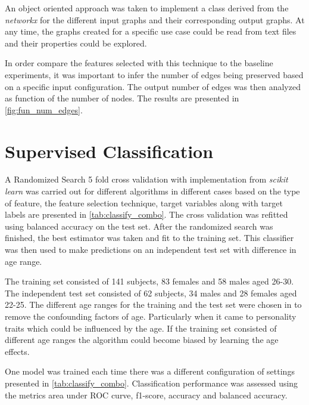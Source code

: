 \documentclass[msthesis.tex]{subfiles}
\begin{document}
An object oriented approach was taken to implement a class derived from the \textit{networkx} \citep{hagberg2008exploring} for the different input graphs and their corresponding output graphs. At any time, the graphs created for a specific use case could be read from text files and their properties could be explored.

In order compare the features selected with this technique to the baseline experiments, it was important to infer the number of edges being preserved based on a specific input configuration. The output number of edges was then analyzed as function of the number of nodes. The results are presented in \autoref{fig:fun_num_edges}.


\section{Supervised Classification}

A Randomized Search 5 fold cross validation with implementation from \textit{scikit learn} was carried out for different algorithms in different cases based on the type of feature, the feature selection technique, target variables along with target labels are presented in \autoref{tab:classify_combo}. The cross validation was refitted using balanced accuracy on the test set. After the randomized search was finished, the best estimator was taken and fit to the training set. This classifier was then used to make predictions on an independent test set with difference in age range.

The training set consisted of 141 subjects, 83 females and 58 males aged 26-30. The independent test set consisted of 62 subjects, 34 males and 28 females aged 22-25. The different age ranges for the training and the test set were chosen in to remove the confounding factors of age. Particularly when it came to personality traits which could be influenced by the age. If the training set consisted of different age ranges the algorithm could become biased by learning the age effects.

One model was trained each time there was a different configuration of settings presented in \autoref{tab:classify_combo}. Classification performance was assessed using the metrics area under \gls{ROC} curve, f1-score, accuracy and balanced accuracy. 

\end{document}
